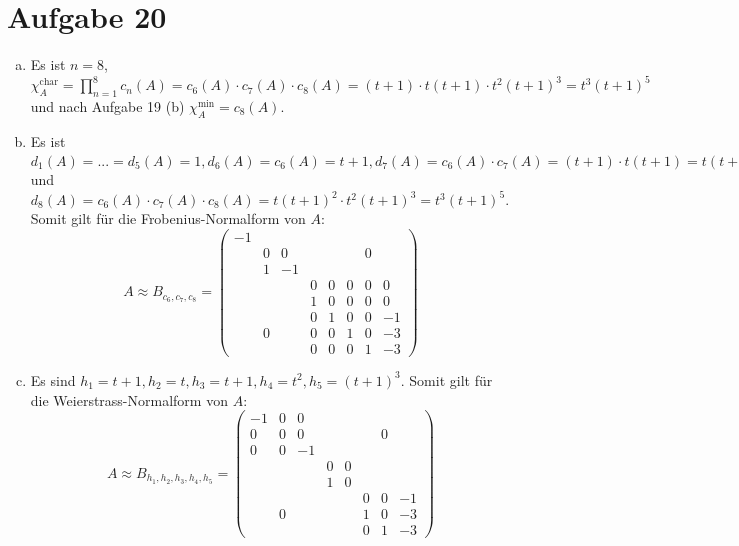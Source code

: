 \documentclass{article}
\theoremstyle{definition}
\begin{document}
\section*{Aufgabe 20}
\begin{enumerate}[(a)]
    \item Es ist $n=8$, $\chi_{A}^{\text{char}}=\prod\limits_{n=1}^{8}c_n(A)=c_6(A)\cdot c_7(A)\cdot c_8(A)=(t+1)\cdot t(t+1)\cdot t^2(t+1)^3=t^3(t+1)^5$ und nach Aufgabe 19 (b) $\chi_{A}^{\text{min}}=c_8(A)$.
    \item Es ist $d_1(A)=...=d_5(A)=1, d_6(A)=c_6(A)=t+1,d_7(A)=c_6(A)\cdot c_7(A)=(t+1)\cdot t(t+1)=t(t+1)^2$ und $d_8(A)= c_6(A)\cdot c_7(A)\cdot c_8(A)=t(t+1)^2\cdot t^2(t+1)^3 = t^3(t+1)^5.$ Somit gilt für die Frobenius-Normalform von $A$:
    $$A\approx B_{c_6,c_7,c_8}=\begin{pmatrix}
        -1 & & & & & & & \\
         & 0 & 0 & & & &0 & \\
         & 1 & -1 & & & & & \\
         &  &  & 0 & 0 & 0 & 0 & 0\\
        & & & 1 & 0& 0&0 & 0\\
        & & &  0& 1& 0& 0& -1\\
        &0 & & 0& 0&1 &0 & -3\\
        & & & 0& 0&0 & 1& -3
    \end{pmatrix}$$
    \item Es sind $h_1=t+1,h_2= t,h_3=t+1,h_4=t^2,h_5=(t+1)^3.$ Somit gilt für die Weierstrass-Normalform von $A$:
    $$A\approx B_{h_1,h_2,h_3,h_4,h_5}=\begin{pmatrix}
        -1& 0& 0& & & & & \\
        0&0 &0 & & & &0 & \\
        0&0 &-1 & & & & & \\
        & & &0 &0 & & & \\
        & & &1 &0 & & & \\
        & & & & & 0& 0&-1 \\
        & 0& & & & 1& 0&-3 \\
        & & & & & 0& 1&-3
    \end{pmatrix}$$

\end{enumerate}
\end{document}
